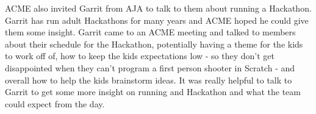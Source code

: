 \documentclass{article}
\begin{document}
ACME also invited Garrit from AJA to talk to them about running a Hackathon. Garrit has run adult Hackathons for many years and ACME hoped he could give them some insight. Garrit came to an ACME meeting and talked to members about their schedule for the Hackathon, potentially having a theme for the kids to work off of, how to keep the kids expectations low - so they don't get disappointed when they can't program a first person shooter in Scratch - and overall how to help the kids brainstorm ideas. It was really helpful to talk to Garrit to get some more insight on running and Hackathon and what the team could expect from the day. \\
\end{document}

